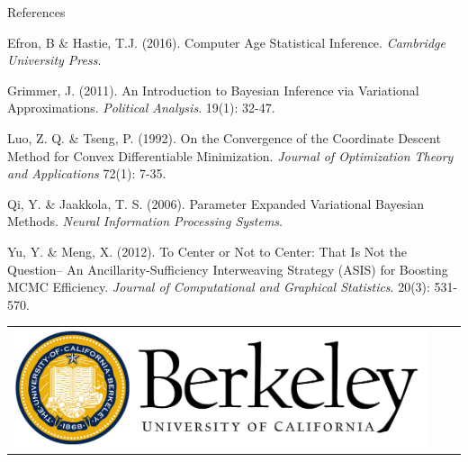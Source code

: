 \documentclass[final]{beamer}
\newlength{\onecolwid}
\begin{document}
\begin{frame}[t]
\begin{columns}[t]
\begin{column}{\onecolwid}
\begin{block}{References}
{\noindent[2] Efron, B \& Hastie, T.J. (2016). Computer Age Statistical Inference. {\itshape Cambridge University Press}.

\noindent[3] Grimmer, J. (2011). An Introduction to Bayesian Inference via Variational Approximations. {\itshape Political Analysis}. 19(1): 32-47.

\noindent[4] Luo, Z. Q. \& Tseng, P. (1992). On the Convergence of the Coordinate Descent Method for Convex Differentiable Minimization. {\itshape Journal of Optimization Theory and Applications} 72(1): 7-35. 

\noindent[5] Qi, Y. \& Jaakkola, T. S. (2006). Parameter Expanded Variational Bayesian Methods. {\itshape Neural Information Processing Systems}. 

\noindent[6] Yu, Y. \& Meng, X. (2012). To Center or Not to Center: That Is Not the
Question-- An Ancillarity-Sufficiency Interweaving Strategy (ASIS) for Boosting MCMC Efficiency. {\itshape Journal of Computational and Graphical Statistics}. 20(3): 531-570. 

}

\end{block}






\begin{center}
\begin{tabular}{ccc}
\includegraphics[width=0.5\linewidth]{logo.png} %
\end{tabular}
\end{center}


\end{column} %

\end{columns} %

\end{frame} %
\end{document}
